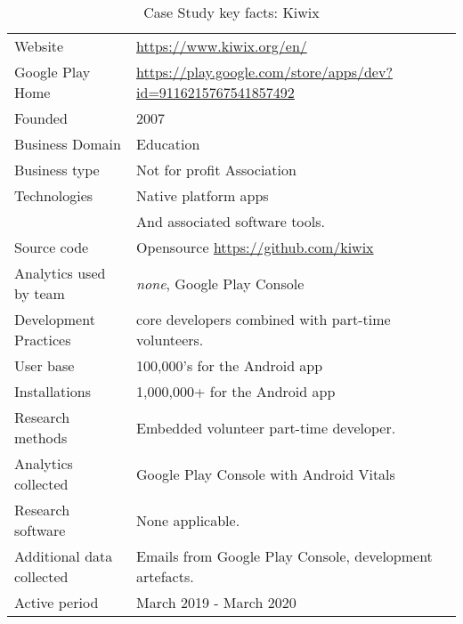 {\renewcommand{\arraystretch}{0.8}%
\begin{table}[htbp!]
    \centering
    \small
    \setlength{\tabcolsep}{6pt}
    \begin{tabular}{lp{9cm}}
       \toprule
       Website &\url{https://www.kiwix.org/en/} \\
       Google Play Home & \url{https://play.google.com/store/apps/dev?id=9116215767541857492} \\
       Founded & 2007 \\
       Business Domain & Education \\
       Business type & Not for profit Association \\
       Technologies  & Native platform apps \\
       & And associated software tools. \\
       Source code  & Opensource \url{https://github.com/kiwix} \\
       Analytics used by team & \textit{none}\footnotemark, Google Play Console \\
       Development Practices & core developers combined with part-time volunteers. \\
       \midrule
       User base & 100,000's for the Android app \\
       Installations & 1,000,000+ for the Android app \\
       \midrule
       Research methods &Embedded volunteer part-time developer\footnotemark. \\
       Analytics collected &Google Play Console with Android Vitals \\
       Research software & None applicable. \\
       Additional data collected &Emails from Google Play Console, development artefacts. \\
       Active period & March 2019 - March 2020 \\
       \bottomrule
    \end{tabular}
    \caption{Case Study key facts: Kiwix}
    \label{tab:kiwix_anaytics_overview}
\end{table}
}


